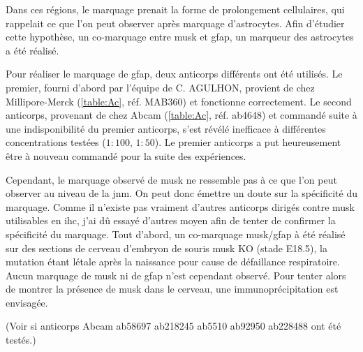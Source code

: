 	Dans ces régions, le marquage prenait la forme de prolongement cellulaires, qui rappelait ce que l'on peut observer après marquage d'astrocytes. Afin d'étudier cette hypothèse, un co-marquage entre \gls{musk} et \acrshort{gfap}, un marqueur des astrocytes a été réalisé.
	
	Pour réaliser le marquage de \acrshort{gfap}, deux anticorps différents ont été utilisés. Le premier, fourni d'abord par l'équipe de C. AGULHON, provient de chez Millipore-Merck (\cref{table:Ac}, réf. MAB360) et fonctionne correctement. Le second anticorps, provenant de chez Abcam (\cref{table:Ac}, réf. ab4648) et commandé suite à une indisponibilité du premier anticorps, s'est révélé inefficace à différentes concentrations testées ($1{:}100$, $1{:}50$). Le premier anticorps a put heureusement être à nouveau commandé pour la suite des expériences.
	
	\begin{figure}[h] %
		\begin{center}
			\begin{subfigure}[h]{0.49\textwidth}
			\end{subfigure}
			\begin{subfigure}[h]{0.49\textwidth}
			\end{subfigure}
		\end{center}
	\end{figure}
	
	Cependant, le marquage observé de \gls{musk} ne ressemble pas à ce que l'on peut observer au niveau de la \gls{jnm}.  On peut donc émettre un doute sur la spécificité du marquage. Comme il n'existe pas vraiment d'autres anticorps dirigés contre \gls{musk} utilisables en \gls{ihc}, j'ai dû essayé d'autres moyen afin de tenter de confirmer la spécificité du marquage. Tout d'abord, un co-marquage \gls{musk}/\acrshort{gfap} à été réalisé sur des sections de cerveau d'embryon de souris \gls{musk} KO (stade E18.5), la mutation étant létale après la naissance pour cause de défaillance respiratoire. Aucun marquage de \gls{musk} ni de \acrshort{gfap} n'est cependant observé. Pour tenter alors de montrer la présence de \gls{musk} dans le cerveau, une immunoprécipitation est envisagée.
	
	(Voir si anticorps Abcam ab58697 ab218245 ab5510 ab92950 ab228488 ont été testés.)

